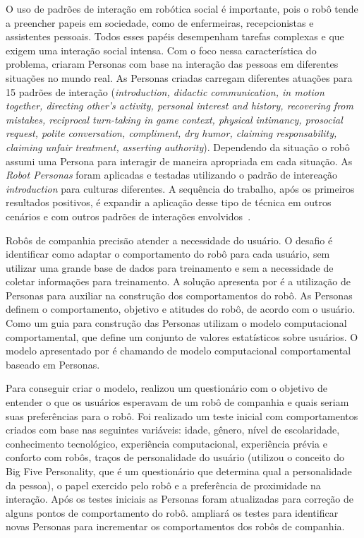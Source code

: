 O uso de padrões de interação em robótica social é importante, pois o robô tende a preencher papeis em sociedade, como de enfermeiras, recepcionistas e assistentes pessoais. Todos esses papéis desempenham tarefas complexas e que exigem uma interação social intensa. Com o foco nessa característica do problema, \textcite{ruckert:2013} criaram Personas com base na interação das pessoas em diferentes situações no mundo real. As Personas criadas carregam diferentes atuações para 15 padrões de interação (\emph{introduction, didactic communication, in motion together, directing other's activity, personal interest and history, recovering from mistakes, reciprocal turn-taking in game context, physical intimancy, prosocial request, polite conversation, compliment, dry humor, claiming responsability, claiming unfair treatment, asserting authority}). Dependendo da situação o robô assumi uma Persona para interagir de maneira apropriada em cada situação. As \emph{Robot Personas} foram aplicadas e testadas utilizando o padrão de intereação \emph{introduction} para culturas diferentes. A sequência do trabalho, após os primeiros resultados positivos, é expandir a aplicação desse tipo de técnica em outros cenários e com outros padrões de interações envolvidos~\cite{ruckert:2013}.

Robôs de companhia precisão atender a necessidade do usuário. O desafio é identificar como adaptar o comportamento do robô para cada usuário, sem utilizar uma grande base de dados para treinamento e sem a necessidade de coletar informações para treinamento. A solução apresenta por \textcite{duque:2013} é a utilização de Personas para auxiliar na construção dos comportamentos do robô. As Personas definem o comportamento, objetivo e atitudes do robô, de acordo com o usuário. Como um guia para construção das Personas utilizam o modelo computacional comportamental, que define um conjunto de valores estatísticos sobre usuários. O modelo apresentado por \textcite{duque:2013} é chamando de modelo computacional comportamental baseado em Personas.

Para conseguir criar o modelo, \textcite{duque:2013} realizou um questionário com o objetivo de entender o que os usuários esperavam de um robô de companhia e quais seriam suas preferências para o robô. Foi realizado um teste inicial com comportamentos criados com base nas seguintes variáveis: idade, gênero, nível de escolaridade, conhecimento tecnológico, experiência computacional, experiência prévia e conforto com robôs, traços de personalidade do usuário (utilizou o conceito do Big Five Personality, que é um questionário que determina qual a personalidade da pessoa), o papel exercido pelo robô e a preferência de proximidade na interação. Após os testes iniciais as Personas foram atualizadas para correção de alguns pontos de comportamento do robô. \textcite{duque:2013} ampliará os testes para identificar novas Personas para incrementar os comportamentos dos robôs de companhia.


